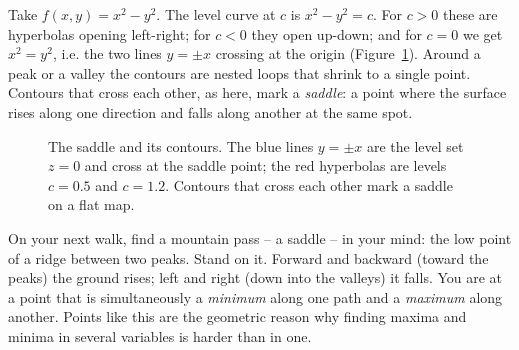 \begin{example}
\label{ch32:ex-saddle}
Take $f(x,y)=x^2-y^2$. The level curve at $c$ is $x^2-y^2=c$. For $c>0$ these are hyperbolas
opening left-right; for $c<0$ they open up-down; and for $c=0$ we get $x^2=y^2$, i.e. the two
lines $y=\pm x$ crossing at the origin (Figure~\ref{ch32:fig-saddle}). Around a peak or a
valley the contours are nested loops that shrink to a single point. Contours that cross each
other, as here, mark a \emph{saddle}: a point where the surface rises along one direction and
falls along another at the same spot.
\end{example}

\begin{figure}[H]
\centering
{}
\hspace{0.2cm}
\caption{The saddle and its contours. The blue lines $y=\pm x$ are the level set $z=0$ and
cross at the saddle point; the red hyperbolas are levels $c=0.5$ and $c=1.2$. Contours that
cross each other mark a saddle on a flat map.}
\label{ch32:fig-saddle}
\end{figure}

\begin{walkbox}
On your next walk, find a mountain pass -- a saddle -- in your mind: the low point of a ridge
between two peaks. Stand on it. Forward and backward (toward the peaks) the ground rises;
left and right (down into the valleys) it falls. You are at a point that is simultaneously a
\emph{minimum} along one path and a \emph{maximum} along another. Points like this are the
geometric reason why finding maxima and minima in several variables is harder than in one.
\end{walkbox}

